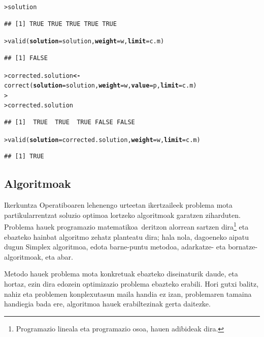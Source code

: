 \documentclass[eu]{ifirak}\usepackage[]{graphicx}\usepackage[]{color}
\makeatletter
\newcommand{\hlstd}[1]{\textcolor[rgb]{0,0,0}{#1}}%
\newcommand{\hlkwb}[1]{\textcolor[rgb]{0.549,0.114,0.412}{\textbf{#1}}}%
\newcommand{\hlkwc}[1]{\textcolor[rgb]{0.659,0.573,0.133}{\textbf{#1}}}%
\newcommand{\hlkwd}[1]{\textcolor[rgb]{0.659,0.133,0.482}{#1}}%
\newenvironment{kframe}{%
 \def\at@end@of@kframe{}%
 \ifinner\ifhmode%
  \def\at@end@of@kframe{\end{minipage}}%
  \begin{minipage}{\columnwidth}%
 \fi\fi%
 \def\FrameCommand##1{\hskip\@totalleftmargin \hskip-\fboxsep
 \colorbox{shadecolor}{##1}\hskip-\fboxsep
     \hskip-\linewidth \hskip-\@totalleftmargin \hskip\columnwidth}%
 \MakeFramed {\advance\hsize-\width
   \@totalleftmargin\z@ \linewidth\hsize
   \@setminipage}}%
 {\par\unskip\endMakeFramed%
 \at@end@of@kframe}
\newenvironment{knitrout}{}{} %
\newcommand{\zkk}{\guillemotleft}
\newcommand{\skk}{\guillemotright}
\makeatother
\begin{document}
\begin{knitrout}
\color{fgcolor}\begin{kframe}
\begin{alltt}
\hlstd{> }\hlstd{solution}
\end{alltt}
\begin{verbatim}
## [1] TRUE TRUE TRUE TRUE TRUE
\end{verbatim}
\begin{alltt}
\hlstd{> }\hlkwd{valid}\hlstd{(}\hlkwc{solution}\hlstd{=solution,} \hlkwc{weight}\hlstd{=w,} \hlkwc{limit}\hlstd{=c.m)}
\end{alltt}
\begin{verbatim}
## [1] FALSE
\end{verbatim}
\begin{alltt}
\hlstd{> }\hlstd{corrected.solution} \hlkwb{<-} \hlkwd{correct}\hlstd{(}\hlkwc{solution}\hlstd{=solution,} \hlkwc{weight}\hlstd{=w,} \hlkwc{value}\hlstd{=p,} \hlkwc{limit}\hlstd{=c.m)}
\hlstd{> }
\hlstd{> }\hlstd{corrected.solution}
\end{alltt}
\begin{verbatim}
## [1]  TRUE  TRUE  TRUE FALSE FALSE
\end{verbatim}
\begin{alltt}
\hlstd{> }\hlkwd{valid}\hlstd{(}\hlkwc{solution}\hlstd{=corrected.solution,} \hlkwc{weight}\hlstd{=w,} \hlkwc{limit}\hlstd{=c.m)}
\end{alltt}
\begin{verbatim}
## [1] TRUE
\end{verbatim}
\end{kframe}
\end{knitrout}


\subsection{Algoritmoak}

Ikerkuntza Operatiboaren lehenengo urteetan ikertzaileek problema mota partikularrentzat soluzio optimoa lortzeko algoritmoak garatzen ziharduten. Problema hauek \zkk programazio matematikoa\skk\ deritzon alorrean sartzen dira\footnote {Programazio lineala eta programazio osoa, hauen adibideak dira.} eta ebazteko hainbat algoritmo zehatz planteatu dira; hala nola, dagoeneko aipatu dugun Simplex algoritmoa, edota barne-puntu metodoa, adarkatze- eta bornatze-algoritmoak, eta abar. 

Metodo hauek problema mota konkretuak ebazteko diseinaturik daude, eta hortaz, ezin dira edozein optimizazio problema ebazteko erabili. Hori gutxi balitz, nahiz eta problemen konplexutasun maila handia ez izan, problemaren tamaina handiegia bada ere, algoritmoa hauek erabiltezinak gerta daitezke. 
\end{document}
